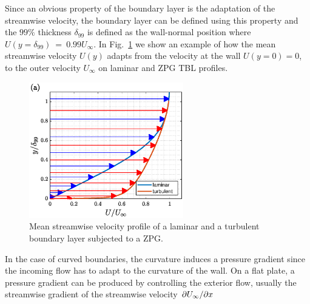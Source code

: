 Since an obvious property of the boundary layer is the adaptation of the streamwise velocity, the boundary layer can be defined using this property and the $99\%$ thickness $\delta_{99}$ is defined as the wall-normal position where $U(y=\delta_{99})~=~0.99U_{\infty}$.
In Fig.~\ref{fig:lam_turb_profiles} we show an example of how the mean streamwise velocity $U(y)$ adapts from the velocity at the wall $U(y=0)=0$, to the outer velocity $U_{\infty}$ on laminar and ZPG TBL profiles.

\begin{figure}[h!]
\centering
\includegraphics[width=0.6\textwidth]{imgs/lam_turb/ZPG_lam_turb.eps}
\caption{ \label{fig:lam_turb_profiles} Mean streamwise velocity profile of a laminar and a turbulent boundary layer subjected to a ZPG.
   }
\end{figure}

In the case of curved boundaries, the curvature induces a pressure gradient since the incoming flow has to adapt to the curvature of the wall. On a flat plate, a pressure gradient can be produced by controlling the exterior flow, usually the streamwise gradient of the streamwise velocity $\pdv{U_{\infty}}/{x}$


